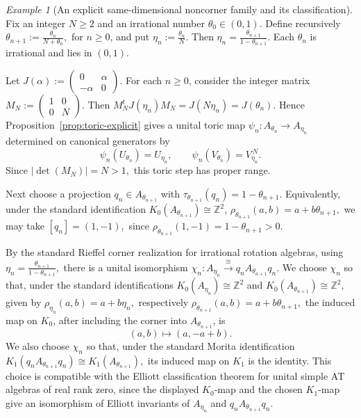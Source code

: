 \documentclass[11pt]{amsart}
\theoremstyle{definition}
\theoremstyle{remark}
\newtheorem{example}[theorem]{Example}
\newcommand{\Z}{\mathbb{Z}}
\begin{document}
\begin{example}[An explicit same-dimensional noncorner family and its classification]
\label{ex:AX7-noncorner}
Fix an integer $N\geq 2$ and an irrational number
$\theta_0\in(0,1)$. Define recursively $\theta_{n+1}:=\frac{\theta_n}{N+\theta_n},$ for 
$n\geq 0$, and put
$\eta_n:=\frac{\theta_n}{N}.$
Then $\eta_n=\frac{\theta_{n+1}}{1-\theta_{n+1}}.$ Each $\theta_n$ is irrational and lies in $(0,1)$.

Let $J(\alpha):=
\begin{pmatrix}
0&\alpha\\
-\alpha&0
\end{pmatrix}.$
For each $n\geq0$, consider the integer matrix $M_N:=
\begin{pmatrix}
1&0\\
0&N
\end{pmatrix}.$
Then $M_N^tJ(\eta_n)M_N=J(N\eta_n)=J(\theta_n).$
Hence Proposition~\ref{prop:toric-explicit} gives a unital toric map
$\psi_n\colon A_{\theta_n}\longrightarrow A_{\eta_n}$
determined on canonical generators by
\[
\psi_n(U_{\theta_n})=U_{\eta_n},
\qquad
\psi_n(V_{\theta_n})=V_{\eta_n}^{\,N}.
\]
Since $|\det(M_N)|=N>1,$
this toric step has proper range.

Next choose a projection $q_n\in A_{\theta_{n+1}}$
with $\tau_{\theta_{n+1}}(q_n)=1-\theta_{n+1}.$
Equivalently, under the standard identification $K_0(A_{\theta_{n+1}})\cong\Z^2$,
$\rho_{\theta_{n+1}}(a,b)=a+b\theta_{n+1},$
we may take $[q_n]=(1,-1),$
since $\rho_{\theta_{n+1}}(1,-1)=1-\theta_{n+1}>0.$

By the standard Rieffel corner realization for irrational rotation algebras,
using $\eta_n=\frac{\theta_{n+1}}{1-\theta_{n+1}},$
there is a unital isomorphism $\chi_n\colon A_{\eta_n}\xrightarrow{\cong}q_nA_{\theta_{n+1}}q_n.$
We choose $\chi_n$ so that, under the standard identifications
$K_0(A_{\eta_n})\cong\Z^2$ and $K_0(A_{\theta_{n+1}})\cong\Z^2,$ given by $\rho_{\eta_n}(a,b)=a+b\eta_n,$ respectively 
$\rho_{\theta_{n+1}}(a,b)=a+b\theta_{n+1},$
the induced map on $K_0$, after including the corner into
$A_{\theta_{n+1}}$, is
\[
(a,b)\longmapsto (a,-a+b).
\]
We also choose $\chi_n$ so that, under the standard Morita identification $K_1(q_nA_{\theta_{n+1}}q_n)\cong K_1(A_{\theta_{n+1}}),$
its induced map on $K_1$ is the identity. This choice is compatible with the Elliott classification theorem for unital
simple AT algebras of real rank zero, since the displayed $K_0$-map and the
chosen $K_1$-map give an isomorphism of Elliott invariants of
$A_{\eta_n}$ and $q_nA_{\theta_{n+1}}q_n$.


\end{example}
\end{document}
